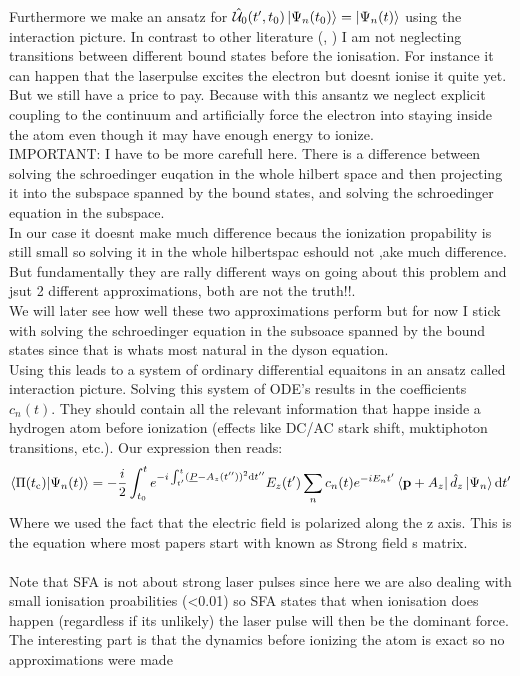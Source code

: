 Furthermore we make an ansatz for $\hat{\mathcal{U}}_0(t',t_0)\ket{\Psi_n(t_0)}=\ket{\Psi_n(t)}$ using the interaction picture.
In contrast to other literature (\cite{Theory_NPS}, \cite{Ivanov20012005}) I am not neglecting transitions between different bound states before the ionisation. 
For instance it can happen that the laserpulse excites the electron but doesnt ionise it quite yet. But we still have a price to pay. 
Because with this ansantz we neglect explicit coupling to the continuum and artificially force the electron into staying inside the atom even though it may have enough energy to ionize.\\
IMPORTANT: I have to be more carefull here. There is a difference between solving the schroedinger euqation in the whole hilbert space and then projecting it into the subspace spanned by the bound states,
and solving the schroedinger equation in the subspace.\\
In our case it doesnt make much difference becaus the ionization propability is still small so solving it in the whole hilbertspac eshould not ,ake much difference.
But fundamentally they are rally different ways on going about this problem and jsut 2 different approximations, both are not the truth!!.\\
We will later see how well these two approximations perform but for now I stick with solving the schroedinger equation in the subsoace spanned by the bound states since that is whats most natural in the dyson equation.\\
Using this leads to a system of ordinary differential equaitons in an ansatz called interaction picture. Solving this system of ODE's results in the coefficients $c_n(t)$. 
They should contain all the relevant information that happe inside a hydrogen atom before ionization (effects like DC/AC stark shift, muktiphoton transitions, etc.).
Our expression then reads:
\begin{equation*}
    \braket{\Pi(t_{\mathrm{c}})|\Psi_n(t)} = -\frac{i}{2}\int_{t_0}^{t} e^{-i \int_{t'}^{t} (\underline{P} - A_z(t''))^2 \mathrm{d} t''}E_z(t')\sum_{n}c_n(t)e^{-iE_nt'}\bra{\mathbf{p}+A_z}\hat{d}_z\ket{\Psi_n} \mathrm{d} t'       \label{eq:smatrix}
\end{equation*}
Where we used the fact that the electric field is polarized along the z axis.
This is the equation where most papers start with \cite{Theory_NPS} known as Strong field s matrix.\\\\

Note that SFA is not about strong laser pulses since here we are also dealing with small ionisation proabilities (<0.01) so SFA states that when ionisation does happen (regardless if its unlikely) the laser pulse will then be the dominant force.\\
The interesting part is that the dynamics before ionizing the atom is exact so no approximations were made 








